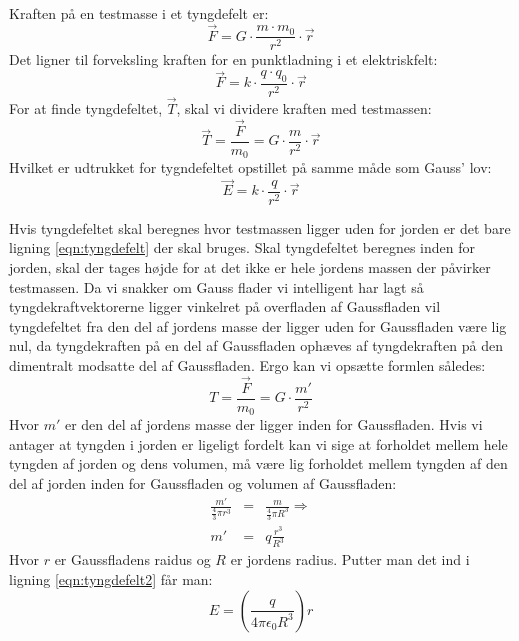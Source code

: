 Kraften på en testmasse i et tyngdefelt er:
\begin{equation}
	\vec{F} = G\cdot \frac{m \cdot m_0}{r^2} \cdot \vec{r}
\end{equation}
Det ligner til forveksling kraften for en punktladning i et elektriskfelt:
\begin{equation}
	\vec{F} = k \cdot \frac{q \cdot q_0}{r^2} \cdot \vec{r}
\end{equation}
For at finde tyngdefeltet, $\vec{T}$, skal vi dividere kraften med testmassen:
\begin{equation}
	\label{eqn:tyngdefelt}
	\vec{T} = \frac{\vec{F}}{m_0} = G \cdot \frac{m}{r^2} \cdot \vec{r}
\end{equation}
Hvilket er udtrukket for tygndefeltet opstillet på samme måde som Gauss' lov:
\begin{equation}
	\vec{E} = k \cdot \frac{q}{r^2} \cdot \vec{r}
\end{equation}

Hvis tyngdefeltet skal beregnes hvor testmassen ligger uden for jorden er det bare ligning \ref{eqn:tyngdefelt} der skal bruges.
Skal tyngdefeltet beregnes inden for jorden, skal der tages højde for at det ikke er hele jordens massen der påvirker testmassen. Da vi snakker om Gauss flader vi intelligent har lagt så tyngdekraftvektorerne ligger vinkelret på overfladen af Gaussfladen vil tyngdefeltet fra den del af jordens masse der ligger uden for Gaussfladen være lig nul, da tyngdekraften på en del af Gaussfladen ophæves af tyngdekraften på den dimentralt modsatte del af Gaussfladen.
Ergo kan vi opsætte formlen således:
\begin{equation}
	\label{eqn:tyngdefelt2}
	T = \frac{\vec{F}}{m_0} = G \cdot \frac{m'}{r^2}
\end{equation}
Hvor $m'$ er den del af jordens masse der ligger inden for Gaussfladen. Hvis vi antager at tyngden i jorden er ligeligt fordelt kan vi sige at forholdet mellem hele tyngden af jorden og dens volumen, må være lig forholdet mellem tyngden af den del af jorden inden for Gaussfladen og volumen af Gaussfladen:
\begin{eqnarray}
	\frac{m'}{\frac{4}{3}\pi r^3} &=& \frac{m}{\frac{4}{3}\pi R^3} \Rightarrow \nonumber \\
	m' &=& q\frac{r^3}{R^3}
\end{eqnarray}
Hvor $r$ er Gaussfladens raidus og $R$ er jordens radius. Putter man det ind i ligning \ref{eqn:tyngdefelt2} får man:
\begin{equation}
	E = (\frac{q}{4\pi \epsilon _0 R^3})r
\end{equation}